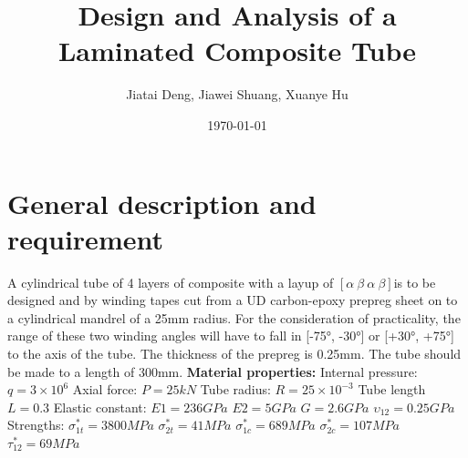 \documentclass[12pt]{article}
\title{\huge Design and Analysis of a Laminated Composite Tube}
\author{Jiatai Deng, Jiawei Shuang, Xuanye Hu}
\affil{Department of Mechanical, Aerospace and Civil Engineering}
\date{\today}
\begin{document}
\newpage
\maketitle
\thispagestyle{empty}
\newpage
\tableofcontents
\thispagestyle{empty} 
\newpage

\section{General description and requirement}
\setcounter{page}{1}
\onehalfspacing
\noindent A cylindrical tube of 4 layers of composite with a layup of 
$\left[\alpha\  \beta\  \alpha\  \beta\right]$is to be designed and by winding tapes cut from a UD carbon-epoxy prepreg sheet on to a cylindrical mandrel of a 25mm radius. For the consideration of practicality, the range of these two winding angles will have to fall in [-75°, -30°] or [+30°, +75°] to the axis of the tube. The thickness of the prepreg is 0.25mm. The tube should be made to a length of 300mm.  \newline
\noindent \textbf{Material properties:}\newline
Internal pressure: $q = 3\times10^{6}$ \qquad Axial force: $P = 25 kN$ \newline
Tube radius: $R = 25\times10^{-3}$ \qquad  Tube length $L = 0.3$ \newline
Elastic constant: $E1 = 236 GPa$ \qquad $E2 = 5 GPa$ \qquad $G = 2.6 GPa$ \qquad $\upsilon_{12} = 0.25 GPa$ \newline
Strengths: $\sigma_{1t}^{*} = 3800 MPa$ \qquad $\sigma_{2t}^{*} = 41 MPa$ \qquad $\sigma_{1c}^{*} = 689 MPa$ \qquad $\sigma_{2c}^{*} = 107 MPa$\qquad\qquad\qquad $\tau _{12}^{*} = 69 MPa$ 
\end{document}
